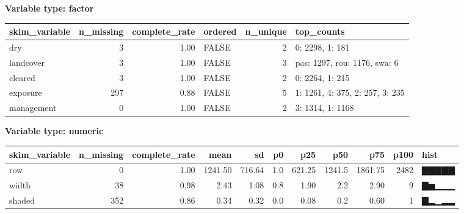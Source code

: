 \documentclass[]{article}
\newenvironment{Shaded}{\begin{snugshade}}{\end{snugshade}}
\newcommand{\CommentTok}[1]{\textcolor[rgb]{0.56,0.35,0.01}{\textit{#1}}}
\newcommand{\KeywordTok}[1]{\textcolor[rgb]{0.13,0.29,0.53}{\textbf{#1}}}
\newcommand{\NormalTok}[1]{#1}
\newcommand{\OperatorTok}[1]{\textcolor[rgb]{0.81,0.36,0.00}{\textbf{#1}}}
\newcommand{\StringTok}[1]{\textcolor[rgb]{0.31,0.60,0.02}{#1}}
\begin{document}
\textbf{Variable type: factor}

\begin{longtable}[]{@{}lrrlrl@{}}
\toprule
skim\_variable & n\_missing & complete\_rate & ordered & n\_unique &
top\_counts\tabularnewline
\midrule
\endhead
dry & 3 & 1.00 & FALSE & 2 & 0: 2298, 1: 181\tabularnewline
landcover & 3 & 1.00 & FALSE & 3 & pas: 1297, rou: 1176, swa:
6\tabularnewline
cleared & 3 & 1.00 & FALSE & 2 & 0: 2264, 1: 215\tabularnewline
exposure & 297 & 0.88 & FALSE & 5 & 1: 1261, 4: 375, 2: 257, 3:
235\tabularnewline
management & 0 & 1.00 & FALSE & 2 & 3: 1314, 1: 1168\tabularnewline
\bottomrule
\end{longtable}

\textbf{Variable type: numeric}

\begin{longtable}[]{@{}lrrrrrrrrrl@{}}
\toprule
skim\_variable & n\_missing & complete\_rate & mean & sd & p0 & p25 &
p50 & p75 & p100 & hist\tabularnewline
\midrule
\endhead
row & 0 & 1.00 & 1241.50 & 716.64 & 1.0 & 621.25 & 1241.5 & 1861.75 &
2482 & ▇▇▇▇▇\tabularnewline
width & 38 & 0.98 & 2.43 & 1.08 & 0.8 & 1.90 & 2.2 & 2.90 & 9 &
▇▅▁▁▁\tabularnewline
shaded & 352 & 0.86 & 0.34 & 0.32 & 0.0 & 0.08 & 0.2 & 0.60 & 1 &
▇▂▁▂▂\tabularnewline
\bottomrule
\end{longtable}

\begin{Shaded}
\end{Shaded}
\end{document}
